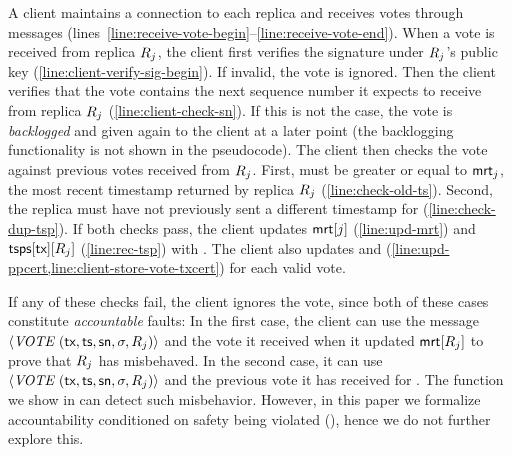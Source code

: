 A client maintains a connection to each replica and receives votes through  messages (lines~\ref{line:receive-vote-begin}--\ref{line:receive-vote-end}).
When a vote is received from replica $R_j$, the client first verifies the signature \sig under $R_j$'s public key (\cref{line:client-verify-sig-begin}). If invalid, the vote is ignored.
Then the client verifies that the vote contains the next sequence number it expects to receive from replica $R_j$ (\cref{line:client-check-sn}). If this is not the case, the vote is \emph{backlogged} and given again to the client at a later point (the backlogging functionality is not shown in the pseudocode).
The client then checks the vote against previous votes received from $R_j$.
First, \tsp must be greater or equal to $\textsf{mrt}_j$, the most recent timestamp returned by replica $R_j$ (\cref{line:check-old-ts}).
Second, the replica must have not previously sent a different timestamp for \tx (\cref{line:check-dup-tsp}).
If both checks pass, the client updates $\textsf{mrt}[j]$ (\cref{line:upd-mrt}) and $\textsf{tsps}[\textsf{tx}][R_j]$ (\cref{line:rec-tsp}) with \tsp.
The client also updates \ppcert and \alltxcert (\cref{line:upd-ppcert,line:client-store-vote-txcert}) for each valid vote.

If any of these checks fail, the client ignores the vote, since both of these cases constitute \emph{accountable} faults: In the first case, the client can use the message $\msgrecord{(\tx, \tsp, \sn, \sig, \rep_j)}$ and the vote it received when it updated $\textsf{mrt}[R_j]$ to prove that $R_j$ has misbehaved. In the second case, it can use $\msgrecord{(\tx, \tsp, \sn, \sig, \rep_j)}$ and the previous vote it has received for \tx.
The \identify{} function we show in  can detect such misbehavior. However, in this paper we formalize accountability conditioned on safety being violated (), hence we do not further explore this.




